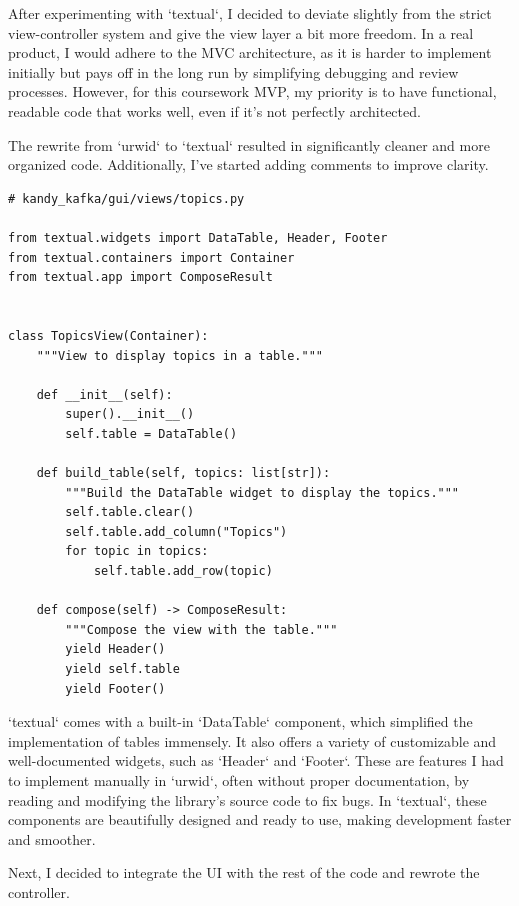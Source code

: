 \documentclass[10pt , a4paper]{report}
\newenvironment{code}{\captionsetup{type=listing}}{}
\begin{document}
After experimenting with `textual`, I decided to deviate slightly from the strict view-controller system and give the view layer a bit more freedom. In a real product, I would adhere to the MVC architecture, as it is harder to implement initially but pays off in the long run by simplifying debugging and review processes. However, for this coursework MVP, my priority is to have functional, readable code that works well, even if it’s not perfectly architected.

The rewrite from `urwid` to `textual` resulted in significantly cleaner and more organized code. Additionally, I’ve started adding comments to improve clarity.

\begin{code}
  \begin{verbatim}
# kandy_kafka/gui/views/topics.py
  
from textual.widgets import DataTable, Header, Footer
from textual.containers import Container
from textual.app import ComposeResult


class TopicsView(Container):
    """View to display topics in a table."""

    def __init__(self):
        super().__init__()
        self.table = DataTable()

    def build_table(self, topics: list[str]):
        """Build the DataTable widget to display the topics."""
        self.table.clear()
        self.table.add_column("Topics")
        for topic in topics:
            self.table.add_row(topic)

    def compose(self) -> ComposeResult:
        """Compose the view with the table."""
        yield Header()
        yield self.table
        yield Footer()

  \end{verbatim}
\end{code}

`textual` comes with a built-in `DataTable` component, which simplified the implementation of tables immensely. It also offers a variety of customizable and well-documented widgets, such as `Header` and `Footer`. These are features I had to implement manually in `urwid`, often without proper documentation, by reading and modifying the library’s source code to fix bugs. In `textual`, these components are beautifully designed and ready to use, making development faster and smoother.

Next, I decided to integrate the UI with the rest of the code and rewrote the controller.
\end{document}
